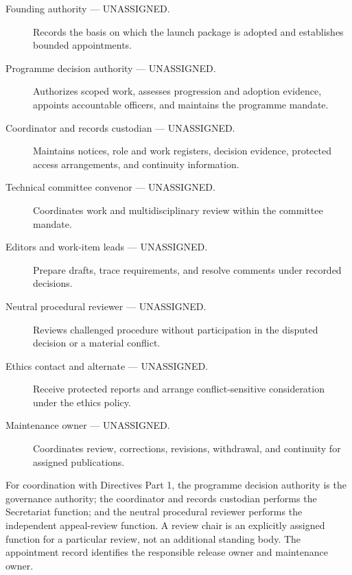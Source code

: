 \documentclass[11pt,a4paper]{article}
\begin{document}
\begin{description}
\item[Founding authority --- UNASSIGNED.] Records the basis on which the launch package is adopted and establishes bounded appointments.
\item[Programme decision authority --- UNASSIGNED.] Authorizes scoped work, assesses progression and adoption evidence, appoints accountable officers, and maintains the programme mandate.
\item[Coordinator and records custodian --- UNASSIGNED.] Maintains notices, role and work registers, decision evidence, protected access arrangements, and continuity information.
\item[Technical committee convenor --- UNASSIGNED.] Coordinates work and multidisciplinary review within the committee mandate.
\item[Editors and work-item leads --- UNASSIGNED.] Prepare drafts, trace requirements, and resolve comments under recorded decisions.
\item[Neutral procedural reviewer --- UNASSIGNED.] Reviews challenged procedure without participation in the disputed decision or a material conflict.
\item[Ethics contact and alternate --- UNASSIGNED.] Receive protected reports and arrange conflict-sensitive consideration under the ethics policy.
\item[Maintenance owner --- UNASSIGNED.] Coordinates review, corrections, revisions, withdrawal, and continuity for assigned publications.
\end{description}

For coordination with Directives Part 1, the programme decision authority is the governance authority; the coordinator and records custodian performs the Secretariat function; and the neutral procedural reviewer performs the independent appeal-review function. A review chair is an explicitly assigned function for a particular review, not an additional standing body. The appointment record identifies the responsible release owner and maintenance owner.


\end{document}
